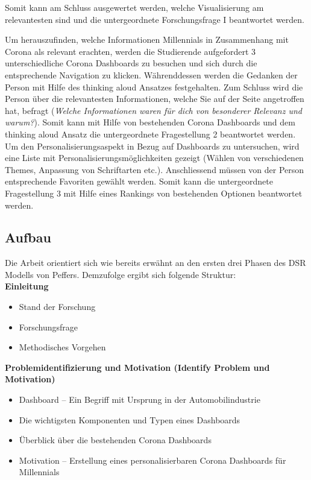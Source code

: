 \documentclass[12pt, oneside]{article}
\begin{document}
Somit kann am Schluss ausgewertet werden, welche Visualisierung am relevantesten sind und die untergeordnete Forschungsfrage I beantwortet werden.

Um herauszufinden, welche Informationen Millennials in Zusammenhang mit Corona als relevant erachten, werden die Studierende aufgefordert 3 unterschiedliche Corona Dashboards zu besuchen und sich durch die entsprechende Navigation zu klicken. Währenddessen werden die Gedanken der Person mit Hilfe des thinking aloud Ansatzes festgehalten. Zum Schluss wird die Person über die relevantesten Informationen, welche Sie auf der Seite angetroffen hat, befragt (\textit{Welche Informationen waren für dich von besonderer Relevanz und warum?}). Somit kann mit Hilfe von bestehenden Corona Dashboards und dem thinking aloud Ansatz die untergeordnete Fragestellung 2 beantwortet werden.\\

Um den Personalisierungsaspekt in Bezug auf Dashboards zu untersuchen, wird eine Liste mit Personalisierungsmöglichkeiten gezeigt (Wählen von verschiedenen Themes, Anpassung von Schriftarten etc.). Anschliessend müssen von der Person entsprechende Favoriten gewählt werden. Somit kann die untergeordnete Fragestellung 3 mit Hilfe eines Rankings von bestehenden Optionen beantwortet werden.

\clearpage
\subsection{Aufbau}
Die Arbeit orientiert sich wie bereits erwähnt an den ersten drei Phasen des DSR Modells von Peffers. Demzufolge ergibt sich folgende Struktur:\\

\textbf{Einleitung}
\begin{itemize}
    \item Stand der Forschung
    \item Forschungsfrage
    \item Methodisches Vorgehen\\
\end{itemize}


\textbf{Problemidentifizierung und Motivation (Identify Problem und Motivation)}
\begin{itemize}
    \item Dashboard – Ein Begriff mit Ursprung in der Automobilindustrie
    \item Die wichtigsten Komponenten und Typen eines Dashboards
    \item Überblick über die bestehenden Corona Dashboards
    \item Motivation – Erstellung eines personalisierbaren Corona Dashboards für Millennials\\
\end{itemize}
\end{document}
